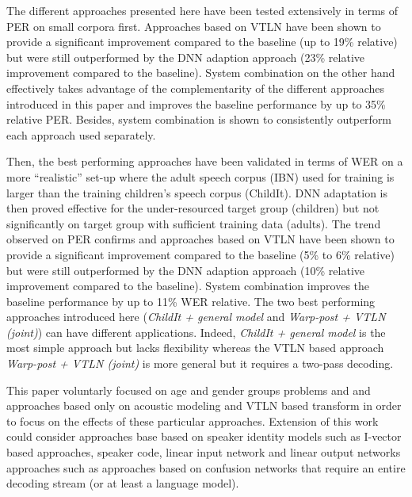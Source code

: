 \documentclass{nle}
\begin{document}
The different approaches presented here have been tested extensively in terms of PER on small corpora first. Approaches based on VTLN have been shown to provide a significant improvement compared to the baseline (up to 19\% relative) but were still outperformed by the DNN adaption approach (23\% relative improvement compared to the baseline). System combination on the other hand effectively takes advantage of the complementarity of the different approaches introduced in this paper and improves the baseline performance by up to 35\% relative PER. Besides, system combination is shown to consistently outperform each approach used separately.

Then, the best performing approaches have been validated in terms of WER on a more ``realistic'' set-up where the adult speech corpus (IBN) used for training is larger than the training children's speech corpus (ChildIt). DNN adaptation is then proved effective for the  under-resourced target group (children) but not significantly on target group with sufficient training data (adults). The trend observed on PER confirms and approaches based on VTLN have been shown to provide a significant improvement compared to the baseline (5\% to 6\% relative) but were still outperformed by the DNN adaption approach (10\% relative improvement compared to the baseline). System combination improves the baseline performance by up to 11\% WER relative. The two best performing approaches introduced here ({\em ChildIt + general model} and {\em Warp-post + VTLN (joint)}) can have different applications. Indeed, {\em ChildIt + general model} is the most simple approach but lacks flexibility  whereas the VTLN based approach {\em Warp-post + VTLN (joint)} is more general but it requires a two-pass decoding.

This paper voluntarly focused on age and gender groups problems and and approaches based only on acoustic modeling and VTLN based transform in order to focus on the effects of these particular approaches. Extension of this work could consider approaches base based on speaker identity models such as I-vector based approaches, speaker code, linear input network and linear output networks approaches such as approaches based on confusion networks that require an entire decoding stream (or at least a language model).
\end{document}
